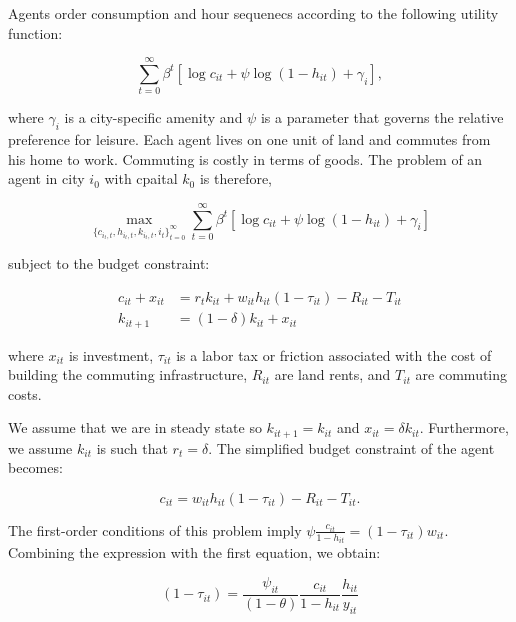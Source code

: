 Agents order consumption and hour sequenecs according to the following utility function:

\begin{equation*}
    \sum_{t=0}^\infty \beta^t \left[ \log c_{it} + \psi \log(1 - h_{it}) + \gamma_i \right],
\end{equation*}

where $\gamma_i$ is a city-specific amenity and $\psi$ is a parameter that governs the relative preference for leisure. Each agent lives on one unit of land and commutes from his home to work. Commuting is costly in terms of goods. The problem of an agent in city $i_0$ with cpaital $k_0$ is therefore,

\begin{equation*}
    \max_{\{c_{i_t, t}, h_{i_t, t}, k_{i_t, t}, i_{t}\}_{t=0}^\infty} \sum_{t=0}^\infty \beta^t \left[ \log c_{it} + \psi \log (1 - h_{it}) + \gamma_i \right]
\end{equation*}

subject to the budget constraint:

\begin{equation*}
    \begin{aligned}
        c_{it} + x_{it} & = r_{t} k_{it} + w_{it} h_{it} (1 - \tau_{it}) - R_{it} - T_{it} \\
        k_{it + 1} & = (1 - \delta) k_{it} + x_{it}
    \end{aligned}
\end{equation*}

where $x_{it}$ is investment, $\tau_{it}$ is a labor tax or friction associated with the cost of building the commuting infrastructure, $R_{it}$ are land rents, and $T_{it}$ are commuting costs.

We assume that we are in steady state so $k_{it + 1} = k_{it}$ and $x_{it} = \delta k_{it}$. Furthermore, we assume $k_{it}$ is such that $r_t = \delta$. The simplified budget constraint of the agent becomes:

\begin{equation}
    c_{it} = w_{it} h_{it} (1 - \tau_{it}) - R_{it} - T_{it}.
\end{equation}

The first-order conditions of this problem imply $\psi \frac{c_{it}}{1 - h_{it}} = (1 - \tau_{it}) w_{it}$. Combining the expression with the first equation, we obtain:

\begin{equation}
    (1 - \tau_{it}) = \frac{\psi_{it}}{(1 - \theta)} \frac{c_{it}}{1 - h_{it}} \frac{h_{it}}{y_{it}}
\end{equation}

